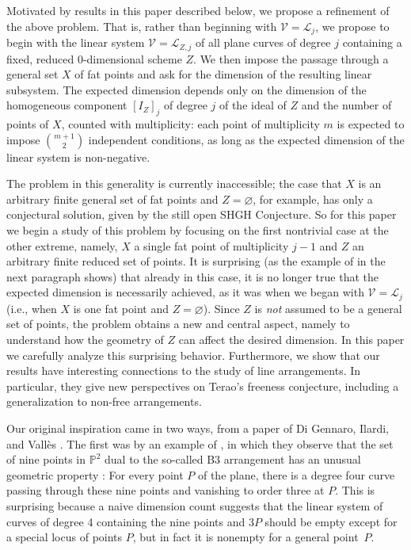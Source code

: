 \documentclass[12pt]{amsart}
\numberwithin{equation}{section}
\theoremstyle{definition}
\begin{document}
Motivated by results in this paper described below, we propose a refinement of the above problem. That is, rather than beginning with $\mathcal V = \mathcal L_j$, we propose to begin with the linear system $\mathcal V= \mathcal L_{Z,j}$ of all plane curves of degree $j$  containing a fixed, reduced 0-dimensional scheme $Z$. We then impose the passage through a general set $X$ of fat points and ask for the dimension of the resulting linear subsystem.  The expected dimension depends only on the dimension of the homogeneous component $[I_Z]_j$ of degree $j$ of the ideal of $Z$ and the number of points of $X$, counted with multiplicity: each point of multiplicity $m$ is expected to impose $\binom{m+1}{2}$ independent conditions, as long as the expected dimension of the linear system is non-negative. 

The problem in this generality is currently inaccessible; the case that $X$ is an arbitrary finite general set of fat points and $Z=\varnothing$, for example, has only a conjectural solution, given by the still open SHGH Conjecture. So for this paper we begin a study of this problem by focusing on the first nontrivial case at the other extreme, namely, $X$ a single fat point  of multiplicity $j-1$ and $Z$  an arbitrary finite reduced set of points.
It is surprising (as the example of \cite{DIV} in the next paragraph shows) that already in this case, it is no longer true that the expected dimension is necessarily achieved, as it was when we began with $\mathcal V= \mathcal L_j$ (i.e., when $X$ is one fat point and $Z=\varnothing$). Since $Z$ is {\em not} assumed to be a general set of points, the problem obtains a new and central aspect, namely to understand how the geometry of $Z$ can affect the desired dimension. 
In this paper we  carefully analyze  this surprising behavior. Furthermore, we show that our results have interesting connections to the study of line arrangements. In particular, they give  new perspectives on Terao's freeness conjecture, including a generalization to non-free arrangements.

Our original inspiration came in two ways, from a paper of 
Di Gennaro, Ilardi, and Vall\`es  \cite{DIV}. 
The first was by an example of \cite{DIV}, in which
 they observe that the set of nine points in ${ \ensuremath{\mathbb{P}}}^2$  dual to 
 the so-called B3 arrangement has an unusual geometric property \cite[Proposition 7.3]{DIV}: For every point $P$ of the plane, there is a degree four curve passing through these nine points and vanishing to order three at  $P$. This is surprising because a naive dimension count suggests that the  linear system of curves of degree 4 containing the nine points and $3P$ should be empty except for a special locus of points $P$, but in fact it is nonempty for a general point~$P$. 
\end{document}
